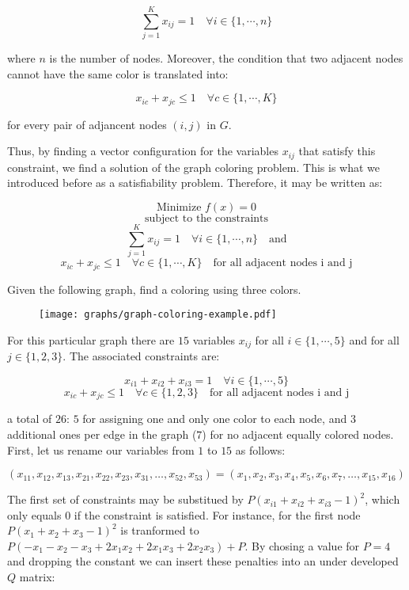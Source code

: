 $$ \sum_{j=1}^K x_{ij} = 1 \quad \forall i \in \{1, \cdots, n\} $$

where $n$ is the number of nodes. Moreover, the condition that two adjacent nodes cannot have the same color is translated into:

$$ x_{ic} + x_{jc} \leq 1 \quad \forall c \in \{1, \cdots, K\} $$

for every pair of adjancent nodes $(i,j)$ in $G$.

Thus, by finding a vector configuration for the variables $x_{ij}$ that satisfy this constraint, we find a solution of the graph coloring problem. This is what we introduced before as a satisfiability problem. Therefore, 
it may be written as:

$$ \text{Minimize } f(x) = 0 $$
$$ \text{subject to the constraints} $$
$$ \sum_{j=1}^K x_{ij} = 1 \quad \forall i \in \{1, \cdots, n\} \quad \text{and}$$
$$ x_{ic} + x_{jc} \leq 1 \quad \forall c \in \{1, \cdots, K\} \quad \text{for all adjacent nodes i and j}$$




Given the following graph, find a coloring using three colors.

\begin{figure}[H]
	\texttt{[image: graphs/graph-coloring-example.pdf]}
	\centering
\end{figure}

For this particular graph there are $15$ variables $x_{ij}$ for all $i \in \{1, \cdots, 5\}$ and for all $j \in \{1, 2, 3\}$. The associated constraints are:

$$ x_{i1} + x_{i2} + x_{i3} = 1 \quad \forall i \in \{1, \cdots, 5\} $$
$$ x_{ic} + x_{jc} \leq 1 \quad \forall c \in \{1, 2, 3\} \quad \text{for all adjacent nodes i and j} $$

a total of $26$: $5$ for  assigning one and only one color to each node, and $3$ additional ones per edge in the graph ($7$) for no adjacent equally colored nodes. First, let us rename our variables from $1$ to $15$ as follows:

$$ (x_{11}, x_{12}, x_{13}, x_{21}, x_{22}, x_{23}, x_{31},\dots, x_{52}, x_{53}) =
	(x_1, x_2, x_3, x_4, x_5, x_6, x_7, \dots, x_{15}, x_{16}) $$

The first set of constraints may be substitued by $P(x_{i1} + x_{i2} + x_{i3} - 1)^2$, which only equals $0$ if the constraint is satisfied. For instance, for the first node $P(x_1 + x_2 + x_3 - 1)^2$ is tranformed to $P(- x_1 - x_2 - x_3 + 2 x_1 x_2 + 2 x_1 x_3 + 2 x_2 x_3) + P$. By chosing a value for $P=4$ and dropping the constant we can  insert these penalties into an under developed $Q$ matrix:

